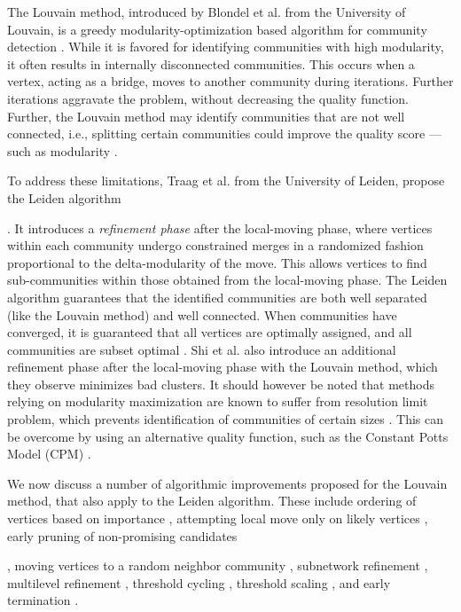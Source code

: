 The Louvain method, introduced by Blondel et al. \cite{com-blondel08} from the University of Louvain, is a greedy modularity-optimization based algorithm for community detection \cite{com-lancichinetti09}. While it is favored for identifying communities with high modularity, it often results in internally disconnected communities. This occurs when a vertex, acting as a bridge, moves to another community during iterations. Further iterations aggravate the problem, without decreasing the quality function. Further, the Louvain method may identify communities that are not well connected, i.e., splitting certain communities could improve the quality score --- such as modularity \cite{com-traag19}.

To address these limitations, Traag et al. \cite{com-traag19} from the University of Leiden, propose the Leiden algorithm. It introduces a \textit{refinement phase} after the local-moving phase, where vertices within each community undergo constrained merges in a randomized fashion proportional to the delta-modularity of the move. This allows vertices to find sub-communities within those obtained from the local-moving phase. The Leiden algorithm guarantees that the identified communities are both well separated (like the Louvain method) and well connected. When communities have converged, it is guaranteed that all vertices are optimally assigned, and all communities are subset optimal \cite{com-traag19}. Shi et al. \cite{com-shi21} also introduce an additional refinement phase after the local-moving phase with the Louvain method, which they observe minimizes bad clusters. It should however be noted that methods relying on modularity maximization are known to suffer from resolution limit problem, which prevents identification of communities of certain sizes \cite{com-ghosh19, com-traag19}. This can be overcome by using an alternative quality function, such as the Constant Potts Model (CPM) \cite{com-traag11}.

We now discuss a number of algorithmic improvements proposed for the Louvain method, that also apply to the Leiden algorithm. These include ordering of vertices based on importance \cite{com-aldabobi22}, attempting local move only on likely vertices \cite{com-ryu16, com-ozaki16, com-zhang21, com-shi21}, early pruning of non-promising candidates \cite{com-ryu16, com-halappanavar17, com-zhang21, com-you22}, moving vertices to a random neighbor community \cite{com-traag15}, subnetwork refinement \cite{com-waltman13, com-traag19}, multilevel refinement \cite{com-rotta11, com-gach14, com-shi21}, threshold cycling \cite{com-ghosh18}, threshold scaling \cite{com-lu15, com-naim17, com-halappanavar17}, and early termination \cite{com-ghosh18}.

